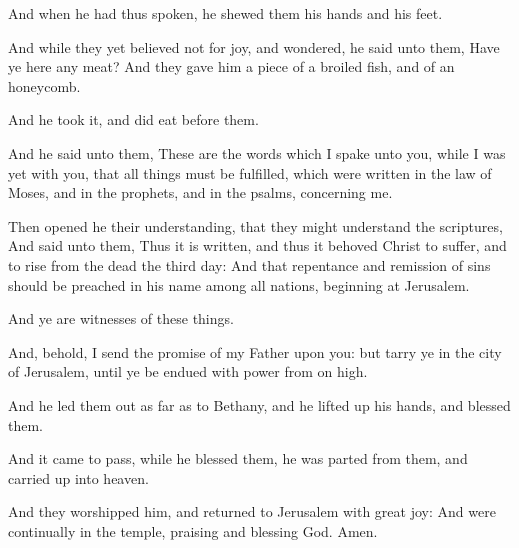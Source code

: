 \Verse And when he had thus spoken, he shewed them his hands and his feet.

\Verse And while they yet believed not for joy, and wondered, he said unto them, Have ye here any meat?  \Verse And they gave him a piece of a broiled fish, and of an honeycomb.

\Verse And he took it, and did eat before them.

\Verse And he said unto them, These are the words which I spake unto you, while I was yet with you, that all things must be fulfilled, which were written in the law of Moses, and in the prophets, and in the psalms, concerning me.

\Verse Then opened he their understanding, that they might understand the scriptures, \Verse And said unto them, Thus it is written, and thus it behoved Christ to suffer, and to rise from the dead the third day: \Verse And that repentance and remission of sins should be preached in his name among all nations, beginning at Jerusalem.

\Verse And ye are witnesses of these things.

\Verse And, behold, I send the promise of my Father upon you: but tarry ye in the city of Jerusalem, until ye be endued with power from on high.

\Verse And he led them out as far as to Bethany, and he lifted up his hands, and blessed them.

\Verse And it came to pass, while he blessed them, he was parted from them, and carried up into heaven.

\Verse And they worshipped him, and returned to Jerusalem with great joy: \Verse And were continually in the temple, praising and blessing God. Amen.

